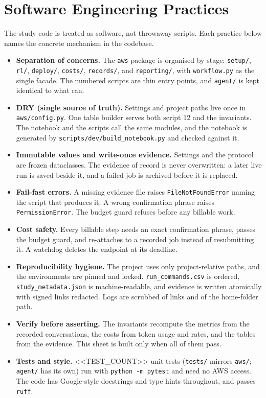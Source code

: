 \documentclass[11pt]{article}
\begin{document}
\section{Software Engineering Practices}
The study code is treated as software, not throwaway scripts. Each practice below names the concrete
mechanism in the codebase.
\begin{itemize}[leftmargin=*]
\item \textbf{Separation of concerns.} The \texttt{aws} package is organised by stage: \texttt{setup/},
\texttt{rl/}, \texttt{deploy/}, \texttt{costs/}, \texttt{records/}, and \texttt{reporting/}, with
\texttt{workflow.py} as the single facade. The numbered scripts are thin entry points, and \texttt{agent/} is
kept identical to what ran.
\item \textbf{DRY (single source of truth).} Settings and project paths live once in \texttt{aws/config.py}.
One table builder serves both script 12 and the invariants. The notebook and the scripts call the same
modules, and the notebook is generated by \texttt{scripts/dev/build\_notebook.py} and checked against it.
\item \textbf{Immutable values and write-once evidence.} Settings and the protocol are frozen dataclasses.
The evidence of record is never overwritten: a later live run is saved beside it, and a failed job is
archived before it is replaced.
\item \textbf{Fail-fast errors.} A missing evidence file raises \texttt{FileNotFoundError} naming the script
that produces it. A wrong confirmation phrase raises \texttt{PermissionError}. The budget guard refuses before
any billable work.
\item \textbf{Cost safety.} Every billable step needs an exact confirmation phrase, passes the budget guard,
and re-attaches to a recorded job instead of resubmitting it. A watchdog deletes the endpoint at its
deadline.
\item \textbf{Reproducibility hygiene.} The project uses only project-relative paths, and the environments
are pinned and locked. \texttt{run\_commands.csv} is ordered, \texttt{study\_metadata.json} is
machine-readable, and evidence is written atomically with signed links redacted. Logs are scrubbed of links
and of the home-folder path.
\item \textbf{Verify before asserting.} The invariants recompute the metrics from the recorded conversations,
the costs from token usage and rates, and the tables from the evidence. This sheet is built only when all of
them pass.
\item \textbf{Tests and style.} <<TEST_COUNT>> unit tests (\texttt{tests/} mirrors \texttt{aws/};
\texttt{agent/} has its own) run with \texttt{python -m pytest} and need no AWS access. The code has
Google-style docstrings and type hints throughout, and passes \texttt{ruff}.
\end{itemize}
\end{document}
